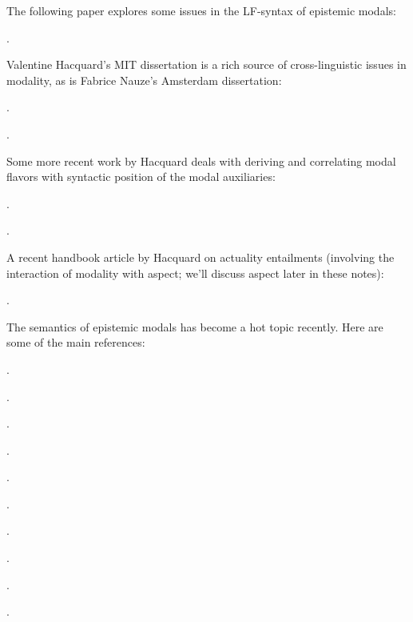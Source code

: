 {The following paper explores some issues in the LF-syntax of epistemic
modals:

\begin{bibentrylist}
	\item {}.
\end{bibentrylist}

Valentine Hacquard's MIT dissertation is a rich source of
cross-linguistic issues in modality, as is Fabrice Nauze's Amsterdam
dissertation:

\begin{bibentrylist}
  \item {}.
  \item {}.
\end{bibentrylist}

Some more recent work by Hacquard deals with deriving and correlating modal
flavors with syntactic position of the modal auxiliaries:

\begin{bibentrylist}
\item {}.
\item {}.
\end{bibentrylist}

A recent handbook article by Hacquard on actuality entailments (involving the
interaction of modality with aspect; we'll discuss aspect later in these notes):

\begin{bibentrylist}
  \item {}.
\end{bibentrylist}

The semantics of epistemic modals has become a hot topic recently.
Here are some of the main references:

\begin{bibentrylist}
	\item {}.
	\item {}.
	\item {}. 
	\item {}. 
	\item {}. 
	\item {}. 	
	\item {}.
	\item {}.
	\item {}.
	\item {}. 
\end{bibentrylist}

}
